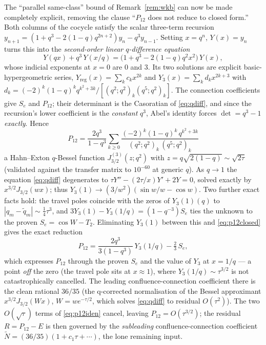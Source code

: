 \begin{remark}\label{rem:qbessel}
The ``parallel same-class'' bound of Remark~\ref{rem:wkb} can now be made completely explicit, removing the
clause ``$P_{12}$ does not reduce to closed form.'' Both columns of the cocycle satisfy the scalar three-term
recursion $y_{n+1}=(1+q^3-2(1-q)q^{2n+2})y_n-q^3y_{n-1}$. Setting $x=q^n$, $Y(x)=y_n$ turns this into the
\emph{second-order linear $q$-difference equation}
\begin{equation}\label{eq:qdiff}
  Y(qx)+q^3\,Y(x/q)=\bigl(1+q^3-2(1-q)q^2x^2\bigr)\,Y(x),
\end{equation}
whose indicial exponents at $x=0$ are $0$ and $3$. Its two solutions are explicit basic-hypergeometric series,
$Y_{\mathrm{reg}}(x)=\sum_k c_kx^{2k}$ and $Y_3(x)=\sum_k d_kx^{2k+3}$ with
$d_k=(-2)^k(1-q)^kq^{k^2+3k}/[(q^2;q^2)_k(q^5;q^2)_k]$. The connection coefficients give $S_e$ and $P_{12}$;
their determinant is the Casoratian of \eqref{eq:qdiff}, and since the recursion's lower coefficient is the
\emph{constant} $q^3$, Abel's identity forces $\det=q^3-1$ \emph{exactly}. Hence
\begin{equation}\label{eq:p12closed}
  \boxed{\;P_{12}=\frac{2q^3}{1-q^3}\sum_{k\ge0}\frac{(-2)^k(1-q)^k\,q^{k^2+3k}}{(q^2;q^2)_k\,(q^5;q^2)_k}\;}
\end{equation}
a Hahn--Exton $q$-Bessel function $J^{(3)}_{3/2}(z;q^2)$ with $z=q\sqrt{2(1-q)}\sim\sqrt{2\tau}$ (validated
against the transfer matrix to $10^{-60}$ at generic $q$). As $q\to1$ the equation \eqref{eq:qdiff} degenerates
to $\tau Y''-(2\tau/x)Y'+2Y=0$, solved exactly by $x^{3/2}J_{3/2}(wx)$; thus $Y_3(1)\to(3/w^2)(\sin w/w-\cos w)$.
Two further exact facts hold: the travel poles coincide with the zeros of $Y_3(1)(q)$ to $|q_m-\tilde q_m|\sim
\tfrac14\tau^3$, and $3Y_3(1)-Y_3(1/q)=(1-q^{-3})S_e$ ties the unknown to the proven $S_e=\cos W-T_2$. Eliminating
$Y_3(1)$ between this and \eqref{eq:p12closed} gives the exact reduction
\begin{equation}\label{eq:p12iden}
  P_{12}=\frac{2q^3}{3(1-q^3)}\,Y_3(1/q)-\tfrac23\,S_e,
\end{equation}
which expresses $P_{12}$ through the proven $S_e$ and the value of $Y_3$ at $x=1/q$ --- a point \emph{off} the
zero (the travel pole sits at $x\approx1$), where $Y_3(1/q)\sim\tau^{3/2}$ is not catastrophically cancelled.
The leading confluence-connection coefficient there is the clean rational $36/35$ (the q-corrected normalisation
of the Bessel approximant $x^{3/2}J_{3/2}(Wx)$, $W=we^{-\tau/2}$, which solves \eqref{eq:qdiff} to residual
$O(\tau^2)$). The two $O(\sqrt\tau)$ terms of \eqref{eq:p12iden} cancel, leaving $P_{12}=O(\tau^{3/2})$; the
residual $R=P_{12}-E$ is then governed by the \emph{subleading} confluence-connection coefficient $\tilde N=
(36/35)(1+c_1\tau+\cdots)$, the lone remaining input.


\end{remark}
